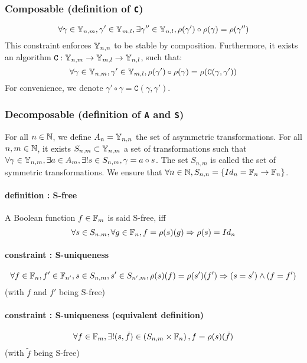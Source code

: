 \documentclass[a4paper,10pt]{article}
\begin{document}
\subsubsection{Composable (definition of \texttt{C})}
\[\forall \gamma \in \mathbb{Y}_{n, m}, \gamma' \in \mathbb{Y}_{m, l}, \exists \gamma'' \in \mathbb{Y}_{n, l}, \rho(\gamma') \circ \rho(\gamma) = \rho(\gamma'')\]
This constraint enforces $\mathbb{Y}_{n, n}$ to be stable by composition.
Furthermore, it exists an algorithm $\mathtt{C} : \mathbb{Y}_{n, m} \rightarrow \mathbb{Y}_{m, l} \rightarrow \mathbb{Y}_{n, l}$, such that:
\[\forall \gamma \in \mathbb{Y}_{n, m}, \gamma' \in \mathbb{Y}_{m, l}, \rho(\gamma') \circ \rho(\gamma) = \rho(\mathtt{C}(\gamma, \gamma'))\]
For convenience, we denote $\gamma' \circ \gamma = \mathtt{C}(\gamma, \gamma')$.

\subsubsection{Decomposable (definition of \texttt{A} and \texttt{S})}

For all $n\in\mathbb{N}$, we define $A_n = \mathbb{Y}_{n, n}$ the set of asymmetric transformations.
For all $n, m\in\mathbb{N}$, it exists $S_{n, m} \subset \mathbb{Y}_{n, m}$ a set of transformations such that $\forall \gamma \in \mathbb{Y}_{n, m}, \exists a \in A_m, \exists! s \in S_{n, m},  \gamma = a \circ s$.
The set $S_{n, m}$ is called the set of symmetric transformations.
We ensure that $\forall n\in\mathbb{N}, S_{n, n} = \{ Id_n = \mathbb{F}_n \rightarrow \mathbb{F}_n \}$.

\paragraph{definition : S-free\\}
A Boolean function $f\in\mathbb{F}_m$ is said S-free, iff
\[\forall s \in S_{n, m}, \forall g \in \mathbb{F}_n, f = \rho(s)(g) \Rightarrow \rho(s) = Id_n\]

\paragraph{constraint : S-uniqueness\\}
\[\forall f\in\mathbb{F}_n, f'\in\mathbb{F}_{n'}, s\in S_{n, m}, s'\in S_{n', m}, \rho(s)(f) = \rho(s')(f') \Rightarrow (s = s') \land (f = f')\]
(with $f$ and $f'$ being S-free)
\paragraph{constraint : S-uniqueness (equivalent definition)\\}
\[\forall f\in\mathbb{F}_m, \exists! (s, \tilde{f})\in \left( S_{n, m} \times \mathbb{F}_n \right), f = \rho(s)(\tilde{f})\]
(with $\tilde{f}$ being S-free)
\end{document}
